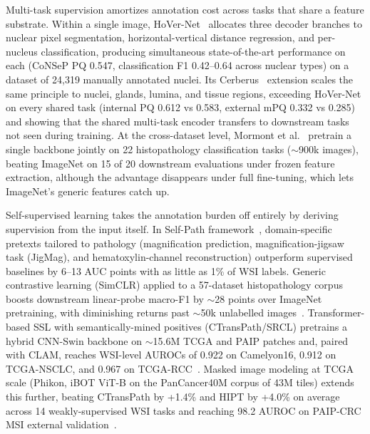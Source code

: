 Multi-task supervision amortizes annotation cost across tasks that share a feature substrate. Within a single image, HoVer-Net~\cite{grahamHoverNetSimultaneousSegmentation2019} allocates three decoder branches to nuclear pixel segmentation, horizontal-vertical distance regression, and per-nucleus classification, producing simultaneous state-of-the-art performance on each (CoNSeP PQ 0.547, classification F1 0.42--0.64 across nuclear types) on a dataset of 24{,}319 manually annotated nuclei.
Its Cerberus~\cite{grahamOneModelAll2023} extension scales the same principle to nuclei, glands, lumina, and tissue regions, exceeding HoVer-Net on every shared task (internal PQ 0.612 vs 0.583, external mPQ 0.332 vs 0.285) and showing that the shared multi-task encoder transfers to downstream tasks not seen during training.
At the cross-dataset level, Mormont et al.~\cite{mormontMultiTaskPreTrainingDeep2021} pretrain a single backbone jointly on 22 histopathology classification tasks ($\sim$900k images), beating ImageNet on 15 of 20 downstream evaluations under frozen feature extraction, although the advantage disappears under full fine-tuning, which lets ImageNet's generic features catch up.

Self-supervised learning takes the annotation burden off entirely by deriving supervision from the input itself. 
In Self-Path framework~\cite{koohbananiSelfPathSelfsupervisionClassification2020}, domain-specific pretexts tailored to pathology (magnification prediction, magnification-jigsaw task (JigMag), and hematoxylin-channel reconstruction) outperform supervised baselines by 6--13 AUC points with as little as 1\% of WSI labels.
Generic contrastive learning (SimCLR) applied to a 57-dataset histopathology corpus boosts downstream linear-probe macro-F1 by $\sim$28 points over ImageNet pretraining, with diminishing returns past $\sim$50k unlabelled images~\cite{cigaSelfSupervisedContrastive2022}.
Transformer-based SSL with semantically-mined positives (CTransPath/SRCL) pretrains a hybrid CNN-Swin backbone on $\sim$15.6M TCGA and PAIP patches and, paired with CLAM, reaches WSI-level AUROCs of 0.922 on Camelyon16, 0.912 on TCGA-NSCLC, and 0.967 on TCGA-RCC~\cite{wangTransformerbasedUnsupervisedContrastive2022}.
Masked image modeling at TCGA scale (Phikon, iBOT ViT-B on the PanCancer40M corpus of 43M tiles) extends this further, beating CTransPath by +1.4\% and HIPT by +4.0\% on average across 14 weakly-supervised WSI tasks and reaching 98.2 AUROC on PAIP-CRC MSI external validation~\cite{filiotScalingSelfSupervisedLearning2024}.

